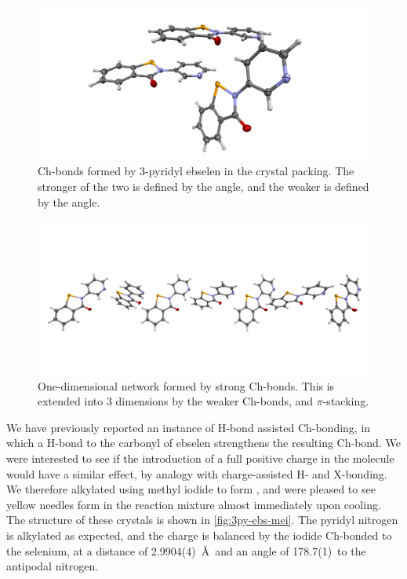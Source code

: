 \begin{refsection}
    \begin{figure}
        \centering
        \includegraphics[width=\linewidth]{Figures/3py-ebs-chbonds.pdf}
        \caption[Ch-bonds formed by 3-pyridyl ebselen  in the crystal packing.]{Ch-bonds formed by 3-pyridyl ebselen  in the crystal packing. The stronger of the two is defined by the  angle, and the weaker is defined by the  angle.}
        \label{fig:3py-ebs-chbonds}
    \end{figure}
    
    \begin{figure}
        \centering
        \includegraphics[width=\linewidth]{Figures/3py-ebs-chain.pdf}
        \caption[One-dimensional network formed by strong  Ch-bonds.]{One-dimensional network formed by strong  Ch-bonds. This is extended into 3 dimensions by the weaker  Ch-bonds, and $\pi$-stacking.}
        \label{fig:3py-ebs-chain}
    \end{figure}
    
    We have previously reported an instance of H-bond assisted Ch-bonding, in which a H-bond to the carbonyl of ebselen strengthens the resulting Ch-bond.
    We were interested to see if the introduction of a full positive charge in the molecule would have a similar effect, by analogy with charge-assisted H- and X-bonding.
    We therefore alkylated  using methyl iodide to form , and were pleased to see yellow needles form in the reaction mixture almost immediately upon cooling.
    The structure of these crystals is shown in \cref{fig:3py-ebs-mei}.
    The pyridyl nitrogen is alkylated as expected, and the charge is balanced by the iodide Ch-bonded to the selenium, at a distance of 2.9904(4)~\AA~and an angle of 178.7(1)\degree~to the antipodal nitrogen.
    

\end{refsection}
